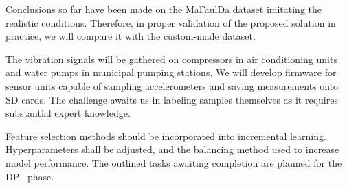 Conclusions so far have been made on the MaFaulDa dataset imitating the realistic conditions. Therefore, in proper validation of the proposed solution in practice, we will compare it with the custom-made dataset. 

The vibration signals will be gathered on compressors in air conditioning units and water pumps in municipal pumping stations. We will develop firmware for sensor units capable of sampling accelerometers and saving measurements onto SD cards. The challenge awaits us in labeling samples themselves as it requires substantial expert knowledge. 

Feature selection methods should be incorporated into incremental learning. Hyperparameters shall be adjusted, and the balancing method used to increase model performance. The outlined tasks awaiting completion are planned for the DP~ phase.